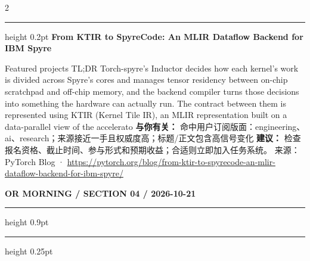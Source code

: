 \documentclass[10.5pt]{ctexart}
\begin{document}
\begin{multicols}{2}
\vspace{2mm}
\hrule height 0.2pt
\vspace{2mm}
{\large\bfseries From KTIR to SpyreCode: An MLIR Dataflow Backend for IBM Spyre}\par
Featured projects TL;DR Torch-spyre’s Inductor decides how each kernel’s work is divided across Spyre’s cores and manages tensor residency between on-chip scratchpad and off-chip memory, and the backend compiler turns those decisions into something the hardware can actually run. The contract between them is represented using KTIR (Kernel Tile IR), an MLIR representation built on a data-parallel view of the accelerato
\textbf{与你有关：} 命中用户订阅版面：engineering、ai、research；来源接近一手且权威度高；标题/正文包含高信号变化
\textbf{建议：} 检查报名资格、截止时间、参与形式和预期收益；合适则立即加入任务系统。
{\footnotesize\color{ormuted} 来源：PyTorch Blog · \url{https://pytorch.org/blog/from-ktir-to-spyrecode-an-mlir-dataflow-backend-for-ibm-spyre/}}
\end{multicols}
\newpage
{\small\bfseries OR MORNING / SECTION 04 / 2026-10-21}
\vspace{2mm}
\hrule height 0.9pt
\vspace{1.5mm}
\hrule height 0.25pt
\vspace{4mm}
\end{document}
